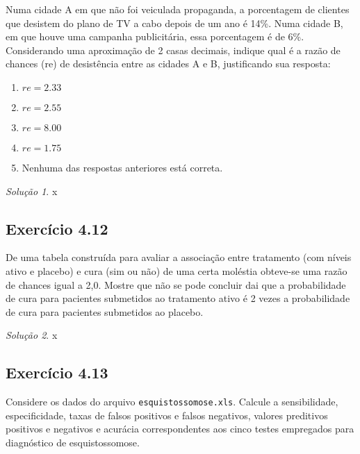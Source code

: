 \documentclass[
]{latex/krantz}
\providecommand{\tightlist}{%
  \setlength{\itemsep}{0pt}\setlength{\parskip}{0pt}}
\theoremstyle{definition}
\theoremstyle{definition}
\theoremstyle{definition}
\theoremstyle{definition}
\theoremstyle{remark}
\newtheorem*{solution}{Solução}
\begin{document}
Numa cidade A em que não foi veiculada propaganda, a porcentagem de clientes que desistem do plano de TV a cabo depois de um ano é 14\%. Numa cidade B, em que houve uma campanha publicitária, essa porcentagem é de 6\%. Considerando uma aproximação de 2 casas decimais, indique qual é a razão de chances (re) de desistência entre as cidades A e B, justificando sua resposta:

\begin{enumerate}
\def\labelenumi{\alph{enumi})}
\tightlist
\item
  \(re = 2.33\)
\item
  \(re = 2.55\)
\item
  \(re = 8.00\)
\item
  \(re = 1.75\)
\item
  Nenhuma das respostas anteriores está correta.
\end{enumerate}

\begin{solution}
x
\end{solution}

\hypertarget{exr4-12}{%
\subsection*{Exercício 4.12}\label{exr4-12}}

De uma tabela construída para avaliar a associação entre tratamento (com níveis ativo e placebo) e cura (sim ou não) de uma certa moléstia obteve-se uma razão de chances igual a 2,0. Mostre que não se pode concluir dai que a probabilidade de cura para pacientes submetidos ao tratamento ativo é 2 vezes a probabilidade de cura para pacientes submetidos ao placebo.

\begin{solution}
x
\end{solution}

\hypertarget{exr4-13}{%
\subsection*{Exercício 4.13}\label{exr4-13}}

Considere os dados do arquivo \texttt{esquistossomose.xls}. Calcule a sensibilidade, especificidade, taxas de falsos positivos e falsos negativos, valores preditivos positivos e negativos e acurácia correspondentes aos cinco testes empregados para diagnóstico de esquistossomose.
\end{document}
